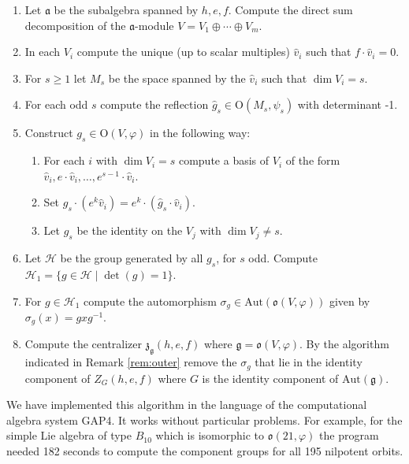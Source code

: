 \documentclass[a4paper,10pt]{amsart}
\newcommand{\mf}{\mathfrak}
\newcommand{\g}{\mf{g}}
\renewcommand{\a}{\mf{a}}
\renewcommand{\o}{\mf{o}}
\newcommand{\z}{\mf{z}}
\renewcommand{\O}{\mathrm{O}}
\newcommand{\Aut}{\mathrm{Aut}}
\numberwithin{equation}{section}
\theoremstyle{remark}
\theoremstyle{remark}
\begin{document}
\begin{enumerate}
\item Let $\a$ be the subalgebra spanned by $h,e,f$. Compute the direct sum
  decomposition of the $\a$-module $V=V_1\oplus \cdots \oplus V_m$.
\item In each $V_i$ compute the unique (up to scalar multiples) $\hat v_i$
  such that $f\cdot \hat v_i=0$.
\item For $s\geq 1$ let $M_s$ be the space spanned by the $\hat v_i$ such
  that $\dim V_i=s$.
\item For each odd $s$ compute the reflection $\hat g_s\in \O(M_s,\psi_s)$ with
  determinant -1.
\item Construct $g_s\in \O(V,\varphi)$ in the following way:
  \begin{enumerate}
  \item For each $i$ with $\dim V_i = s$ compute a basis of $V_i$ of the form
    $\hat v_i, e\cdot \hat v_i,\ldots, e^{s-1}\cdot \hat v_i$.
  \item Set $g_s\cdot (e^k\hat v_i) = e^k\cdot (\hat g_s\cdot \hat v_i)$.
  \item Let $g_s$ be the identity on the $V_j$ with $\dim V_j\neq s$.  
  \end{enumerate}
\item Let $\mathcal{H}$ be the group generated by all $g_s$, for $s$ odd.
  Compute
  $\mathcal{H}_1 = \{ g\in \mathcal{H} \mid \det(g)=1\}$.
\item For $g\in \mathcal{H}_1$ compute the automorphism $\sigma_g\in
  \Aut(\o(V,\varphi))$
  given by $\sigma_g(x) = gxg^{-1}$.
\item Compute the centralizer $\z_\g(h,e,f)$ where $\g= \o(V,\varphi)$.
  By the algorithm indicated in Remark \ref{rem:outer} remove the $\sigma_g$
  that lie in the identity component of $Z_G(h,e,f)$ where $G$ is the
  identity component of $\Aut(\g)$.
\end{enumerate}

We have implemented this algorithm in the language of the computational
algebra system {\sf GAP}4. It works without particular problems. For example,
for the simple Lie algebra of type $B_{10}$ which is isomorphic to
$\o(21,\varphi)$ the program
needed 182 seconds to compute the component groups for all 195 nilpotent orbits.
\end{document}
